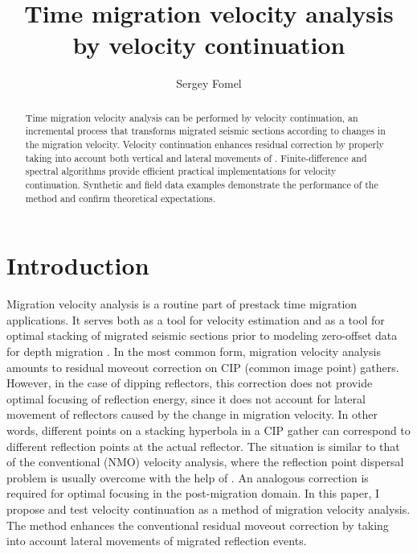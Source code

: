 \def\figdir{./Fig}
\def\cakedir{.}


\title{Time migration velocity analysis by velocity continuation}

\author{Sergey Fomel}
\maketitle

\begin{abstract}
Time migration velocity analysis can be performed by velocity
  continuation, an incremental process that transforms
  migrated seismic sections according to changes in the migration velocity.
  Velocity continuation enhances residual  correction by
  properly taking into account both vertical and lateral movements of
  . Finite-difference and spectral algorithms
  provide efficient practical implementations for velocity continuation.
  Synthetic and field data examples demonstrate the performance of the method
  and confirm theoretical expectations.
\end{abstract}

\section{Introduction}
Migration velocity analysis is a routine part of prestack time
migration applications. It serves both as a tool for velocity
estimation \cite[]{FBR08-06-02240234} and as a tool for optimal
stacking of migrated seismic sections prior to modeling zero-offset
data for depth migration \cite[]{GEO62-02-05680576}. In the most
common form, migration velocity analysis amounts to residual moveout
correction on CIP (common image point) gathers. However, in the case
of dipping reflectors, this correction does not provide optimal
focusing of reflection energy, since it does not account for lateral
movement of reflectors caused by the change in migration velocity. In
other words, different points on a stacking hyperbola in a CIP gather
can correspond to different reflection points at the actual reflector.
The situation is similar to that of the conventional  (NMO) velocity analysis, where the reflection point
dispersal problem is usually overcome with the help of  \cite[]{FBR04-07-00070024,dmo}. An analogous correction is
required for optimal focusing in the post-migration domain. In this
paper, I propose and test velocity continuation as a method of
migration velocity analysis. The method enhances the conventional
residual moveout correction by taking into account lateral movements
of migrated reflection events.


